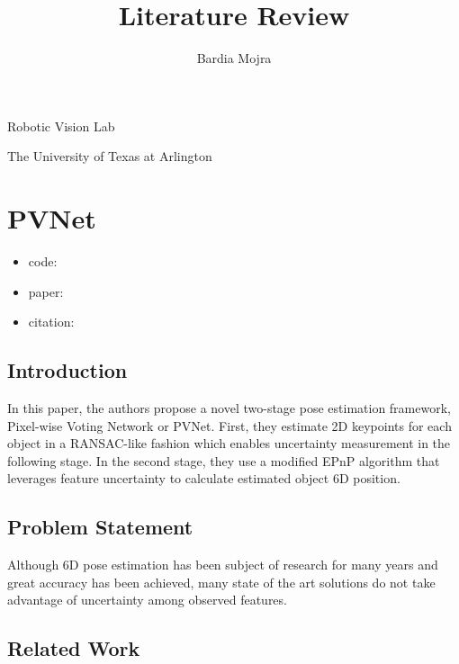 \documentclass[11pt]{article}
\title{Literature Review}
\author{Bardia Mojra}
\begin{document}
\maketitle
\thispagestyle{empty}

\bigskip
\bigskip
\begin{center}
      Robotic Vision Lab
\end{center}

\begin{center}
      The University of Texas at Arlington
\end{center}

\section{PVNet}

\begin{itemize}
      \item code: \url{}
      \item paper: \url{}
      \item citation:
\end{itemize}

      \subsection{Introduction}
      \par In this paper, the authors propose a novel two-stage pose estimation
      framework, Pixel-wise Voting Network or PVNet. First, they estimate 2D
      keypoints for each object in a RANSAC-like fashion which enables uncertainty
      measurement in the following stage. In the second stage, they use a
      modified EPnP algorithm \cite{lepetit2009epnp} that leverages feature
      uncertainty \cite{ferraz2014leveraging} to calculate estimated object 6D
      position.

      \subsection{Problem Statement}
      \par Although 6D pose estimation has been subject of research for many
      years and great accuracy has been achieved, many state of the art solutions
      do not take advantage of uncertainty among observed features.


      \subsection{Related Work}
\end{document}
